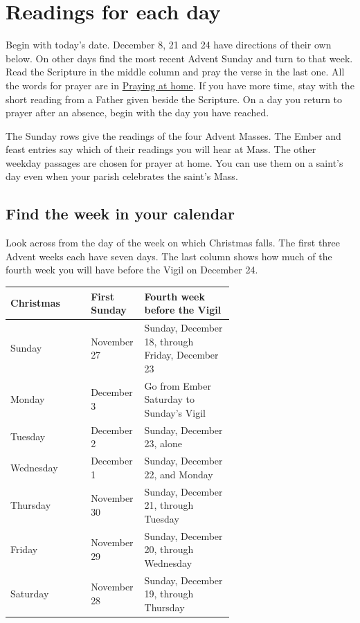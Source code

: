 \section{Readings for each day}
\label{sec:advent-daily-readings}

Begin with today's date. December 8, 21 and 24 have directions of their
own below. On other days find the most recent Advent Sunday and turn to
that week. Read the Scripture in the middle column and pray the verse
in the last one. All the words for prayer are in \hyperref[sec:advent-home-prayers]{Praying at home}.
If you have more time, stay with the short reading from a Father given
beside the Scripture. On a day you return to prayer after an absence,
begin with the day you have reached.

The Sunday rows give the readings of the four Advent Masses. The Ember
and feast entries say which of their readings you will hear at Mass.
The other weekday passages are chosen for prayer at home. You can use
them on a saint's day even when your parish celebrates the saint's Mass.

\subsection{Find the week in your calendar}

Look across from the day of the week on which Christmas falls. The first
three Advent weeks each have seven days. The last column shows how much
of the fourth week you will have before the Vigil on December 24.

\begin{longtable}{@{}lp{0.24\linewidth}p{0.40\linewidth}@{}}
\textbf{Christmas} & \textbf{First Sunday} & \textbf{Fourth week before the Vigil} \\
\hline
\endhead
Sunday & November 27 & Sunday, December 18, through Friday, December 23 \\
Monday & December 3 & Go from Ember Saturday to Sunday's Vigil \\
Tuesday & December 2 & Sunday, December 23, alone \\
Wednesday & December 1 & Sunday, December 22, and Monday \\
Thursday & November 30 & Sunday, December 21, through Tuesday \\
Friday & November 29 & Sunday, December 20, through Wednesday \\
Saturday & November 28 & Sunday, December 19, through Thursday \\
\end{longtable}

